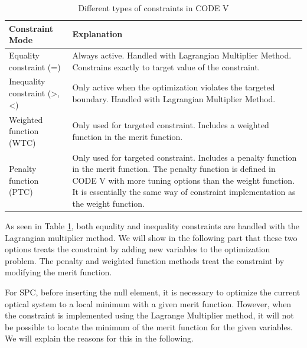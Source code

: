 \begin{table}[h!]
    \centering
    \captionsetup{justification=centering}
    \caption{Different types of constraints in CODE V\cite{codevmanual}}
    \label{table: codevconstraints}
    \vspace{-1em}
    \begin{tabular}{ p{} | m{} }
    \hline 
    \textbf{Constraint Mode} & \textbf{Explanation}\\
    \hline
    Equality constraint (=) & Always active. Handled with Lagrangian Multiplier Method. Constrains exactly to target value of the constraint.  \\
    \hline
    Inequality constraint (>, <) & Only active when the optimization violates the targeted boundary. Handled with Lagrangian Multiplier Method.\\
    \hline
    Weighted function (WTC) & Only used for targeted constraint. Includes a weighted function in the merit function.\\
    \hline
    Penalty function (PTC) & Only used for targeted constraint. Includes a penalty function in the merit function. The penalty function is defined in CODE V with more tuning options than the weight function. It is essentially the same way of constraint implementation as the weight function.\\
    \hline
    \end{tabular}
\end{table}

As seen in Table \ref{table: codevconstraints}, both equality and inequality constraints are handled with the Lagrangian multiplier method. We will show in the following part that these two options treats the constraint by adding new variables to the optimization problem. The penalty and weighted function methods treat the constraint by modifying the merit function. 

For SPC, before inserting the null element, it is necessary to optimize the current optical system to a local minimum with a given merit function. However, when the constraint is implemented using the Lagrange Multiplier method, it will not be possible to locate the minimum of the merit function for the given variables. We will explain the reasons for this in the following. 

